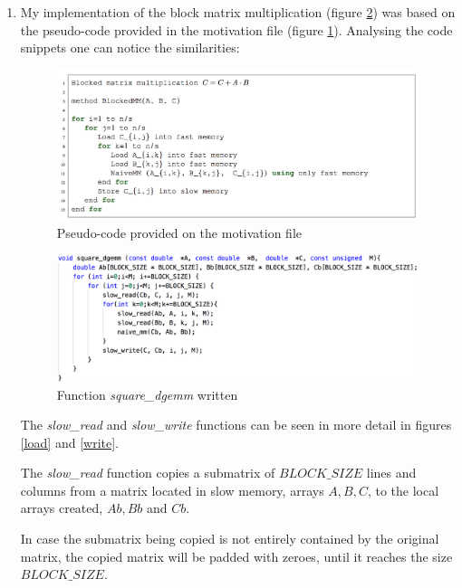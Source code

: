 \documentclass[unicode,11pt,a4paper,oneside,numbers=endperiod,openany]{scrartcl}
\begin{document}
    \begin{enumerate} %

        \item My implementation of the block matrix multiplication (figure \ref{code}) was based on the pseudo-code provided in the motivation file (figure \ref{pseudocode}).
            Analysing the code snippets one can notice the similarities:

            \begin{figure}[H]
                \includegraphics[width=\linewidth]{./img/pseudocode}
                \caption{Pseudo-code provided on the motivation file}
                \label{pseudocode}
            \end{figure}

            \begin{figure}[H]
                \includegraphics[width=\linewidth]{./img/code}
                \caption{Function \textit{square\_dgemm} written}
                \label{code}
            \end{figure}

            The \textit{slow\_read} and \textit{slow\_write} functions can be seen in more detail in figures \ref{load} and \ref{write}.

            The \textit{slow\_read} function copies a submatrix of $BLOCK\_SIZE$ lines and columns from a matrix located in slow memory, arrays $A, B, C$, to the local arrays created, $Ab, Bb$ and $Cb$.

            In case the submatrix being copied is not entirely contained by the original matrix, the copied matrix will be padded with zeroes, until it reaches the size $BLOCK\_SIZE$.


\end{enumerate}
\end{document}
